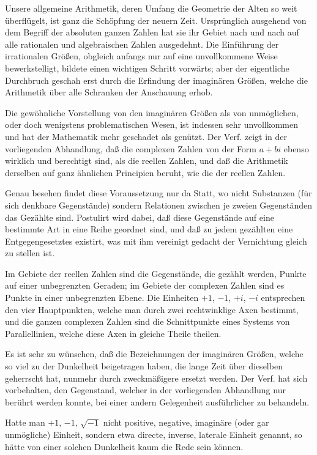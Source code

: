 \documentclass[12pt,a4paper]{article}
\theoremstyle{plain}
\theoremstyle{definition}
\theoremstyle{remark}
\begin{document}
Unsere allgemeine Arithmetik, deren Umfang die Geometrie der Alten so weit überflügelt, ist ganz die Schöpfung der neuern Zeit. Ursprünglich ausgehend von dem Begriff der absoluten ganzen Zahlen hat sie ihr Gebiet nach und nach auf alle rationalen und algebraischen Zahlen ausgedehnt. Die Einführung der irrationalen Größen, obgleich anfangs nur auf eine unvollkommene Weise bewerkstelligt, bildete einen wichtigen Schritt vorwärts; aber der eigentliche Durchbruch geschah erst durch die Erfindung der imaginären Größen, welche die Arithmetik über alle Schranken der Anschauung erhob.

Die gewöhnliche Vorstellung von den imaginären Größen als von unmöglichen, oder doch wenigstens problematischen Wesen, ist indessen sehr unvollkommen und hat der Mathematik mehr geschadet als genützt. Der Verf. zeigt in der vorliegenden Abhandlung, daß die complexen Zahlen von der Form $a+bi$ ebenso wirklich und berechtigt sind, als die reellen Zahlen, und daß die Arithmetik derselben auf ganz ähnlichen Principien beruht, wie die der reellen Zahlen.

Genau besehen findet diese Voraussetzung nur da Statt, wo nicht Substanzen (für sich denkbare Gegenstände) sondern Relationen zwischen je zweien Gegenständen das Gezählte sind. Postulirt wird dabei, daß diese Gegenstände auf eine bestimmte Art in eine Reihe geordnet sind, und daß zu jedem gezählten eine Entgegengesetztes existirt, was mit ihm vereinigt gedacht der Vernichtung gleich zu stellen ist.

Im Gebiete der reellen Zahlen sind die Gegenstände, die gezählt werden, Punkte auf einer unbegrenzten Geraden; im Gebiete der complexen Zahlen sind es Punkte in einer unbegrenzten Ebene. Die Einheiten $+1$, $-1$, $+i$, $-i$ entsprechen den vier Hauptpunkten, welche man durch zwei rechtwinklige Axen bestimmt, und die ganzen complexen Zahlen sind die Schnittpunkte eines Systems von Parallellinien, welche diese Axen in gleiche Theile theilen.

Es ist sehr zu wünschen, daß die Bezeichnungen der imaginären Größen, welche so viel zu der Dunkelheit beigetragen haben, die lange Zeit über dieselben geherrscht hat, nunmehr durch zweckmäßigere ersetzt werden. Der Verf. hat sich vorbehalten, den Gegenstand, welcher in der vorliegenden Abhandlung nur berührt werden konnte, bei einer andern Gelegenheit ausführlicher zu behandeln.

Hatte man $+1$, $-1$, $\sqrt{-1}$ nicht positive, negative, imaginäre (oder gar unmögliche) Einheit, sondern etwa directe, inverse, laterale Einheit genannt, so hätte von einer solchen Dunkelheit kaum die Rede sein können.
\end{document}
